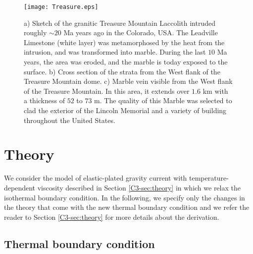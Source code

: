 \begin{figure}[h!]
  \begin{center}
    \graphicspath{ {/Users/thorey/Documents/These/Manuscript/Figure/Chapter4/} }
    \texttt{[image: Treasure.eps]}
    \caption{a)  Sketch of  the granitic  Treasure Mountain  Laccolith
      intruded  roughly  $\sim  20$  Ma years  ago  in  the  Colorado,
      USA. The Leadville Limestone  (white layer) was metamorphosed by
      the heat  from the intrusion,  and was transformed  into marble.
      During the  last $10$  Ma years,  the area  was eroded,  and the
      marble is today exposed to the surface.  b) Cross section of the
      strata from  the West  flank of the  Treasure Mountain  dome. c)
      Marble  vein  visible  from  the  West  flank  of  the  Treasure
      Mountain.   In  this area,  it  extends  over  $1.6$ km  with  a
      thickness of  $52$ to $73$  m.  The  quality of this  Marble was
      selected  to clad  the exterior  of the  Lincoln Memorial  and a
      variety of building throughout the United States.}
    \label{Treasure}
  \end{center}
\end{figure}
\section{Theory}
\label{C4-sec:theory-1}

We  consider   the  model  of  elastic-plated   gravity  current  with
temperature-dependent      viscosity     described      in     Section
\ref{C3-sec:theory}  in   which  we  relax  the   isothermal  boundary
condition. In the following, we specify only the changes in the theory
that come  with the new  thermal boundary  condition and we  refer the
reader  to  Section \ref{C3-sec:theory}  for  more  details about  the
derivation.

\subsection{Thermal boundary condition}
\label{C4-sec:formulation-1}

